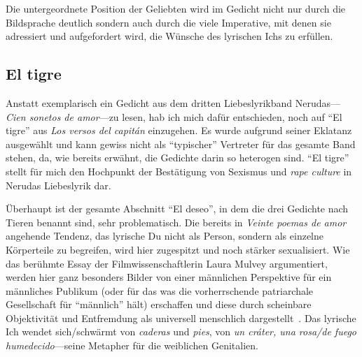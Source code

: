 Die untergeordnete Position der Geliebten wird im Gedicht nicht nur durch die Bildsprache deutlich sondern auch durch die viele Imperative, mit denen sie adressiert und aufgefordert wird, die Wünsche des lyrischen Ichs zu erfüllen.


\subsection{El tigre}

Anstatt exemplarisch ein Gedicht aus dem dritten Liebeslyrikband Nerudas—\textit{Cien sonetos de amor}—zu lesen, hab ich mich dafür entschieden, noch auf ``El tigre'' aus \textit{Los versos del capitán} einzugehen.
Es wurde aufgrund seiner Eklatanz ausgewählt und kann gewiss nicht als ``typischer'' Vertreter für das gesamte Band stehen, da, wie bereits erwähnt, die Gedichte darin so heterogen sind.
``El tigre'' stellt für mich den Hochpunkt der Bestätigung von Sexismus und \textit{rape culture} in Nerudas Liebeslyrik dar.

Überhaupt ist der gesamte Abschnitt ``El deseo'', in dem die drei Gedichte nach Tieren benannt sind, sehr problematisch.
Die bereits in \textit{Veinte poemas de amor} angehende Tendenz, das lyrische Du nicht als Person, sondern als einzelne Körperteile zu begreifen, wird hier zugespitzt und noch stärker sexualisiert.
Wie das berühmte Essay der Filmwissenschaftlerin Laura Mulvey argumentiert, werden hier ganz besonders Bilder von einer männlichen Perspektive für ein männliches Publikum (oder für das was die vorherrschende patriarchale Gesellschaft für ``männlich'' hält) erschaffen und diese durch scheinbare Objektivität und Entfremdung als universell menschlich dargestellt~\cite{Mulvey1975}.
Das lyrische Ich wendet sich/schwärmt von \textit{caderas} und \textit{pies}, von \textit{un cráter, una rosa/de fuego humedecido}—seine Metapher für die weiblichen Genitalien.


